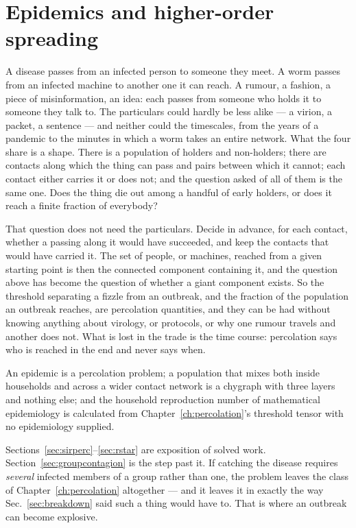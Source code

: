 \chapter{Epidemics and higher-order spreading}
\label{ch:epidemics}

A disease passes from an infected person to someone they meet. A worm passes
from an infected machine to another one it can reach. A rumour, a fashion, a
piece of misinformation, an idea: each passes from someone who holds it to
someone they talk to. The particulars could hardly be less alike --- a virion,
a packet, a sentence --- and neither could the timescales, from the years of a
pandemic to the minutes in which a worm takes an entire network. What the four
share is a shape. There is a population of holders and non-holders; there are
contacts along which the thing can pass and pairs between which it cannot; each
contact either carries it or does not; and the question asked of all of them is
the same one. Does the thing die out among a handful of early holders, or does
it reach a finite fraction of everybody?

That question does not need the particulars. Decide in advance, for each
contact, whether a passing along it would have succeeded, and keep the contacts
that would have carried it. The set of people, or machines, reached from a
given starting point is then the connected component containing it, and the
question above has become the question of whether a giant component exists. So
the threshold separating a fizzle from an outbreak, and the fraction of the
population an outbreak reaches, are percolation quantities, and they can be had
without knowing anything about virology, or protocols, or why one rumour
travels and another does not. What is lost in the trade is the time course:
percolation says who is reached in the end and never says when.

An epidemic is
a percolation problem; a population that mixes both inside households and
across a wider contact network is a chygraph with three layers and nothing
else; and the household reproduction number of mathematical epidemiology is
calculated from Chapter~\ref{ch:percolation}'s threshold tensor with no
epidemiology supplied.

Sections~\ref{sec:sirperc}--\ref{sec:rstar} are exposition of solved work.
Section~\ref{sec:groupcontagion} is the step past it. If catching
the disease requires \emph{several} infected members of a group rather than
one, the problem leaves the class of Chapter~\ref{ch:percolation} altogether ---
and it leaves it in exactly the way Sec.~\ref{sec:breakdown} said such a thing
would have to. That is where an outbreak can become explosive.


